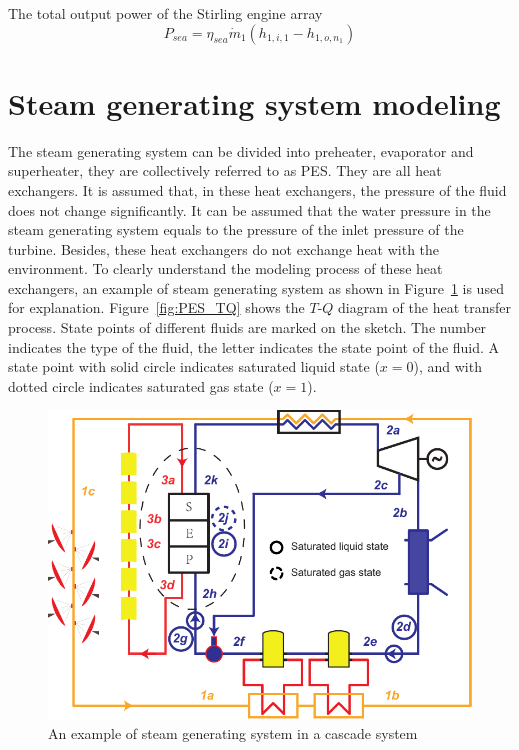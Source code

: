 The total output power of the Stirling engine array
\begin{equation}
  P_{sea}=\eta_{sea}\dot{m}_{1}(h_{1,i,1}-h_{1,o,n_1})
\end{equation}

\section{Steam generating system modeling}
The steam generating system can be divided into preheater, evaporator and superheater, they are collectively referred to as PES. They are all heat exchangers. It is assumed that, in these heat exchangers, the pressure of the fluid does not change significantly. It can be assumed that the water pressure in the steam generating system equals to the pressure of the inlet pressure of the turbine. Besides, these heat exchangers do not exchange heat with the environment.
To clearly understand the modeling process of these heat exchangers, an example of steam generating system as shown in Figure~\ref{fig:PES} is used for explanation. Figure~\ref{fig:PES_TQ} shows the $T$-$Q$ diagram of the heat transfer process. State points of different fluids are marked on the sketch. The number indicates the type of the fluid, the letter indicates the state point of the fluid. A state point with solid circle indicates saturated liquid state ($x = 0$), and with dotted circle indicates saturated gas state ($x = 1$).


\noindent \begin{figure}[!ht]
\begin{center}
	\includegraphics[width = 0.8\columnwidth]{fig/PES}
	\caption{An example of steam generating system in a cascade system}
	\label{fig:PES}
\end{center}
\end{figure}

